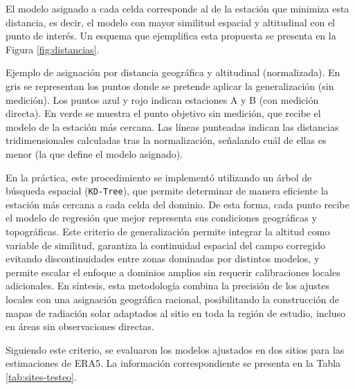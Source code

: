 \documentclass[letterpaper,12pt, twoside]{report}
\providecommand{\DIFdeltex}[1]{{\protect\color{red} \scriptsize #1}} %
\providecommand{\DIFdelFL}[1]{\DIFdel{#1}} %
\providecommand{\DIFdel}[1]{\texorpdfstring{\DIFdeltex{#1}}{}} %
\begin{document}
\DIFdel{El modelo asignado a cada celda corresponde al de la estación que minimiza esta distancia, es decir, el modelo con mayor similitud espacial y altitudinal con el punto de interés. Un esquema que ejemplifica esta propuesta se presenta en la Figura \ref{fig:distancias}.
}%

{%
\DIFdelFL{Ejemplo de asignación por distancia geográfica y altitudinal (normalizada). En gris se representan los puntos donde se pretende aplicar la generalización (sin medición). Los puntos azul y rojo indican estaciones A y B (con medición directa). En verde se muestra el punto objetivo sin medición, que recibe el modelo de la estación más cercana. Las líneas punteadas indican las distancias tridimensionales calculadas tras la normalización, señalando cuál de ellas es menor (la que define el modelo asignado).}}

\DIFdel{En la práctica, este procedimiento se implementó utilizando un árbol de búsqueda espacial (\texttt{KD-Tree}), que permite determinar de manera eficiente la estación más cercana a cada celda del dominio. De esta forma, cada punto recibe el modelo de regresión que mejor representa sus condiciones geográficas y topográficas. Este criterio de generalización permite integrar la altitud como variable de similitud, garantiza la continuidad espacial del campo corregido evitando discontinuidades entre zonas dominadas por distintos modelos, y permite escalar el enfoque a dominios amplios sin requerir calibraciones locales adicionales. En síntesis, esta metodología combina la precisión de los ajustes locales con una asignación geográfica racional, posibilitando la construcción de mapas de radiación solar adaptados al sitio en toda la región de estudio, incluso en áreas sin observaciones directas.}%

\DIFdel{Siguiendo este criterio, se evaluaron los modelos ajustados en dos sitios para las estimaciones de ERA5. La información correspondiente se presenta en la Tabla \ref{tab:sites-testeo}. 
}%
\end{document}
